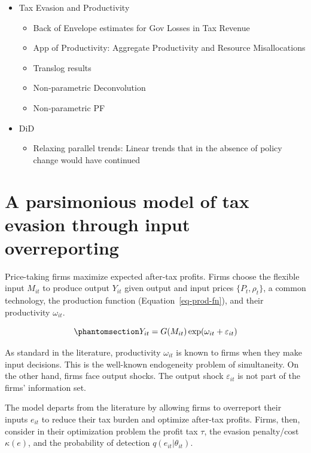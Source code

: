 \documentclass[
  12pt]{article}
\providecommand{\tightlist}{%
  \setlength{\itemsep}{0pt}\setlength{\parskip}{0pt}}\usepackage{longtable,booktabs,array}
\theoremstyle{definition}
\theoremstyle{remark}
\begin{document}
\begin{itemize}
\tightlist
\item
  Tax Evasion and Productivity

  \begin{itemize}
  \tightlist
  \item
    Back of Envelope estimates for Gov Losses in Tax Revenue
  \item
    App of Productivity: Aggregate Productivity and Resource
    Misallocations
  \item
    Translog results
  \item
    Non-parametric Deconvolution
  \item
    Non-parametric PF
  \end{itemize}
\item
  DiD

  \begin{itemize}
  \tightlist
  \item
    Relaxing parallel trends: Linear trends that in the absence of
    policy change would have continued
  \end{itemize}
\end{itemize}

\section{A parsimonious model of tax evasion through input
overreporting}\label{a-parsimonious-model-of-tax-evasion-through-input-overreporting}

Price-taking firms maximize expected after-tax profits. Firms choose the
flexible input \(M_{it}\) to produce output \(Y_{it}\) given output and
input prices \(\{P_{t}, \rho_t\}\), a common technology, the production
function (Equation~\ref{eq-prod-fn}), and their productivity
\(\omega_{it}\).

\begin{equation}\phantomsection\label{eq-prod-fn}{
Y_{it}=G(M_{it})\exp(\omega_{it}+\varepsilon_{it})
}\end{equation}

As standard in the literature, productivity \(\omega_{it}\) is known to
firms when they make input decisions. This is the well-known endogeneity
problem of simultaneity. On the other hand, firms face output shocks.
The output shock \(\varepsilon_{it}\) is not part of the firms'
information set.

The model departs from the literature by allowing firms to overreport
their inputs \(e_{it}\) to reduce their tax burden and optimize
after-tax profits. Firms, then, consider in their optimization problem
the profit tax \(\tau\), the evasion penalty/cost \(\kappa(e)\), and the
probability of detection \(q(e_{it}|\theta_{it})\).
\end{document}
